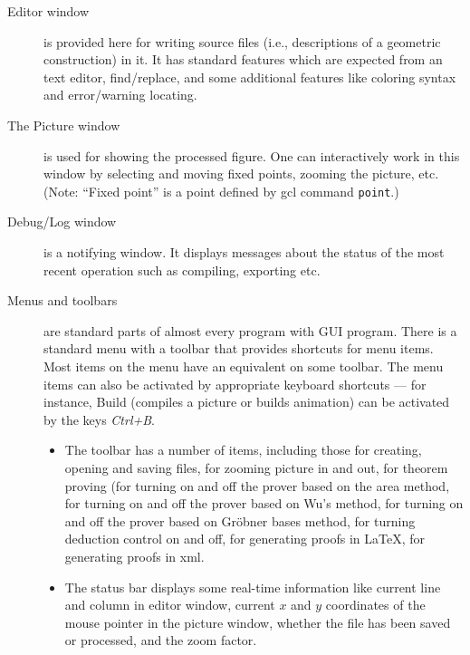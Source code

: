 \documentclass[a4paper]{book}
\begin{document}
\begin{description}
\item[Editor window] is provided here for writing source files (i.e.,
descriptions of a geometric construction) in it. It has standard
features which are expected from an text editor, find/replace, and
some additional features like coloring syntax and error/warning locating.

\item[The Picture window] is used for showing the processed figure.
One can interactively work in this window by selecting and moving 
fixed points, zooming the picture, etc.
(Note: ``Fixed point'' is a point defined by {\sc gcl} command \verb|point|.)

\item[Debug/Log window] is a notifying window. It displays messages
about the status of the most recent operation such as compiling,
exporting etc.

\item[Menus and toolbars] are standard parts of almost every program with 
GUI program. There is a standard menu with a toolbar that provides shortcuts 
for menu items. Most items on the menu have an equivalent on some toolbar. 
The menu items can also be activated by appropriate keyboard shortcuts ---
for instance, Build (compiles a picture or builds animation) can be 
activated by the keys {\it Ctrl+B}.

\begin{itemize}
\item The toolbar has a number of items, including those for
creating, opening and saving files, 
for zooming picture in and out, for theorem proving 
(for turning on and off the prover based on the area method,
for turning on and off the prover based on Wu's method,
for turning on and off the prover based on Gr\"obner bases method, 
for turning deduction control on and off,
for generating proofs in \LaTeX{}, 
for generating proofs in {\sc xml}.


\item The status bar displays some real-time information like
current line and column in editor window, current $x$ and $y$ coordinates of
the mouse pointer in the picture window, whether the file has been saved
or processed, and the zoom factor.
\end{itemize}

\end{description}
\end{document}
